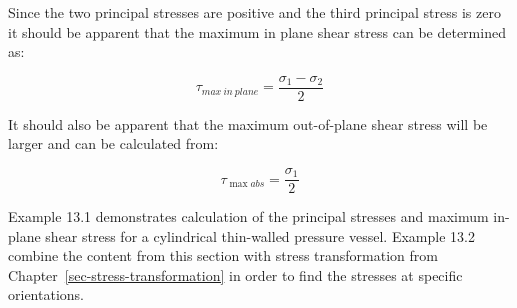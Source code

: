\documentclass[
  letterpaper,
  DIV=11,
  numbers=noendperiod]{scrreprt}
\theoremstyle{definition}
\theoremstyle{remark}
\begin{document}
Since the two principal stresses are positive and the third principal
stress is zero it should be apparent that the maximum in plane shear
stress can be determined as:

\[
\tau_{max~in~plane}=\frac{\sigma_1-\sigma_2}{2}
\]

It should also be apparent that the maximum out-of-plane shear stress
will be larger and can be calculated from:

\[
\tau_{\max a b s}=\frac{\sigma_1}{2}
\]

Example 13.1 demonstrates calculation of the principal stresses and
maximum in-plane shear stress for a cylindrical thin-walled pressure
vessel. Example 13.2 combine the content from this section with stress
transformation from Chapter~\ref{sec-stress-transformation} in order to
find the stresses at specific orientations.
\end{document}
